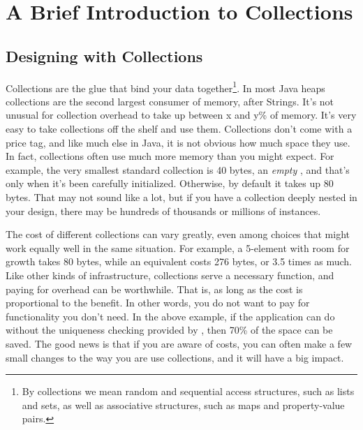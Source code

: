 \chapter{A Brief Introduction to Collections}
\label{chapter:brief-introduction-collections}

\section{Designing with Collections}
Collections are the glue that bind your data together\footnote{By
collections we mean random and sequential access structures, such as lists and
sets, as well as associative structures, such as maps and property-value pairs.}. 
In most Java heaps collections are the second largest consumer of memory,
after Strings.  It's not unusual for collection overhead to take up between
x and y\% of memory. It's very easy to take collections off the shelf
and use them. Collections don't come with a price tag, and like much else
in Java, it is not obvious how much space they use. In fact,
collections often use much more memory than you might expect. For example,
the very smallest standard collection is 40 bytes, an \emph{empty}
, and that's only when it's been carefully initialized. 
Otherwise, by default it takes up 80 bytes. That may not sound like a lot,
but if you have a collection deeply nested in your design, there may be hundreds
of thousands or millions of instances.

The cost of different collections can vary greatly, even among choices that
might work equally well in the same situation. For example, a 5-element 
with room for growth takes 80 bytes, while an equivalent  costs 276 bytes, or 3.5 times as much. 
Like other kinds of infrastructure, collections serve a necessary
function, and paying for overhead can be worthwhile.  That is, as long as
the cost is proportional to the benefit. In other words, you do not want to pay
for functionality you don't need. In the above example, if
the application can do without the uniqueness checking provided by
, then 70\% of the space can be saved.  The good news is that
if you are aware of costs, you can often make a few small changes to
the way you are use collections, and it will have a big impact.

